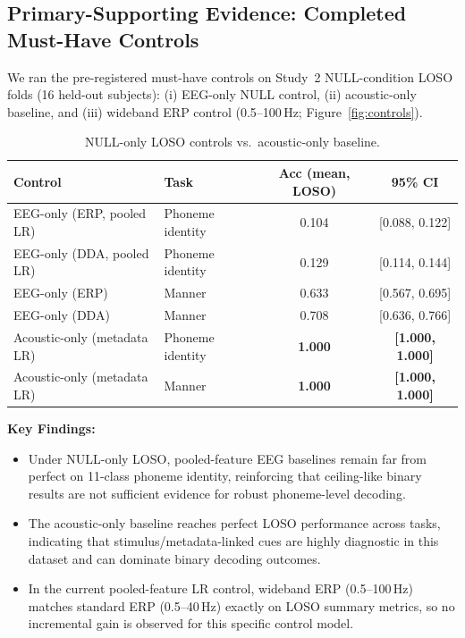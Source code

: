 \documentclass[11pt,a4paper]{article}
\begin{document}
\subsection{Primary-Supporting Evidence: Completed Must-Have Controls}

We ran the pre-registered must-have controls on Study~2 NULL-condition LOSO
folds (16 held-out subjects): (i) EEG-only NULL control, (ii) acoustic-only
baseline, and (iii) wideband ERP control (0.5--100\,Hz; Figure~\ref{fig:controls}).

\begin{table}[H]
\centering
\caption{NULL-only LOSO controls vs.\ acoustic-only baseline.}
\label{tab:controls}
\begin{tabular}{llcc}
\toprule
\textbf{Control} & \textbf{Task} & \textbf{Acc (mean, LOSO)} & \textbf{95\% CI} \\
\midrule
EEG-only (ERP, pooled LR) & Phoneme identity & 0.104 & [0.088, 0.122] \\
EEG-only (DDA, pooled LR) & Phoneme identity & 0.129 & [0.114, 0.144] \\
EEG-only (ERP)            & Manner           & 0.633 & [0.567, 0.695] \\
EEG-only (DDA)            & Manner           & 0.708 & [0.636, 0.766] \\
Acoustic-only (metadata LR) & Phoneme identity & \textbf{1.000} & \textbf{[1.000, 1.000]} \\
Acoustic-only (metadata LR) & Manner           & \textbf{1.000} & \textbf{[1.000, 1.000]} \\
\bottomrule
\end{tabular}
\end{table}

\textbf{Key Findings:}
\begin{itemize}
  \item Under NULL-only LOSO, pooled-feature EEG baselines remain far from
    perfect on 11-class phoneme identity, reinforcing that ceiling-like binary
    results are not sufficient evidence for robust phoneme-level decoding.
  \item The acoustic-only baseline reaches perfect LOSO performance across
    tasks, indicating that stimulus/metadata-linked cues are highly diagnostic
    in this dataset and can dominate binary decoding outcomes.
  \item In the current pooled-feature LR control, wideband ERP (0.5--100\,Hz)
    matches standard ERP (0.5--40\,Hz) exactly on LOSO summary metrics, so no
    incremental gain is observed for this specific control model.
\end{itemize}
\end{document}
